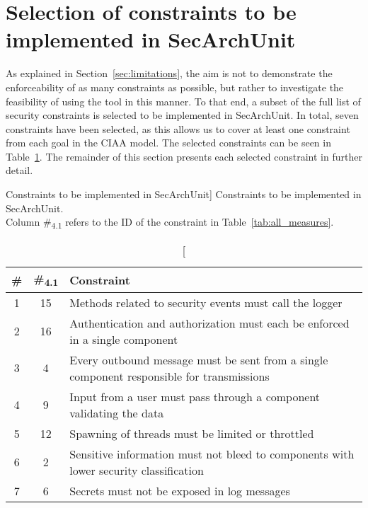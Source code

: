 \section{Selection of constraints to be implemented in SecArchUnit}

As explained in Section~\ref{sec:limitations}, the aim is not to demonstrate the enforceability of as many constraints as possible, but rather to investigate the feasibility of using the tool in this manner. To that end, a subset of the full list of security constraints is selected to be implemented in SecArchUnit. In total, seven constraints have been selected, as this allows us to cover at least one constraint from each goal in the CIAA model. The selected constraints can be seen in Table~\ref{tab:selected_measures}. The remainder of this section presents each selected constraint in further detail.

\begin{table}
\captionsetup{justification=centering}
\caption
    [Constraints to be implemented in SecArchUnit]
    {Constraints to be implemented in SecArchUnit.\\Column \#\textsubscript{4.1} refers to the ID of the constraint in Table~\ref{tab:all_measures}.}
\begin{center}
\begin{tabular}{ccp{12.4cm}}
\hline
\textbf{\#} & \textbf{\#\textsubscript{4.1}} & \textbf{Constraint} \\
\hline
1 & 15 & Methods related to security events must call the logger\\
\rowcolor{RowColor}
2 & 16 & Authentication and authorization must each be enforced in a single component\\
3 & 4 & Every outbound message must be sent from a single component responsible for transmissions\\
\rowcolor{RowColor}
4 & 9 & Input from a user must pass through a component validating the data\\
5 & 12 & Spawning of threads must be limited or throttled\\
\rowcolor{RowColor}
6 & 2 & Sensitive information must not bleed to components with lower security classification\\
7 & 6 & Secrets must not be exposed in log messages\\
\hline
\end{tabular}
\end{center}
\label{tab:selected_measures}
\end{table}

